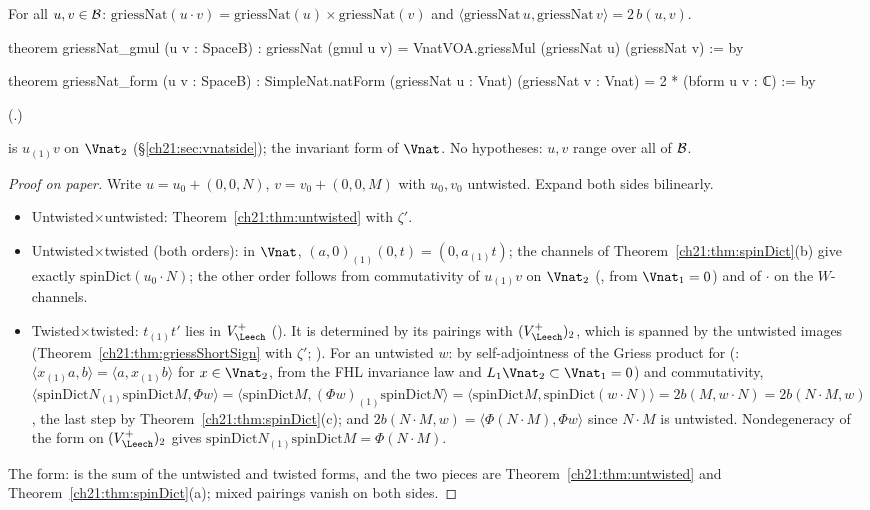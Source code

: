 \begin{theorem}\label{ch21:thm:griessNat}
For all $u,v\in\mathcal{B}$: $\mathrm{griessNat}(u\cdot v)=\mathrm{griessNat}(u)\times\mathrm{griessNat}(v)$
and $\langle\mathrm{griessNat}\,u,\mathrm{griessNat}\,v\rangle=2\,b(u,v)$.
\end{theorem}
\begin{leancode}
theorem griessNat_gmul (u v : SpaceB) :
    griessNat (gmul u v) = VnatVOA.griessMul (griessNat u) (griessNat v) := by
\end{leancode}
\begin{leancode}
theorem griessNat_form (u v : SpaceB) :
    SimpleNat.natForm (griessNat u : Vnat) (griessNat v : Vnat) = 2 * (bform u v : ℂ) := by
\end{leancode}
(.)
\begin{dictionary}
 is $u_{(1)}v$ on $\Vnat_2$ (\S\ref{ch21:sec:vnatside});  the
invariant form of $\Vnat$.  No hypotheses: $u,v$ range over all of $\mathcal{B}$.
\end{dictionary}
\begin{proof}[Proof on paper]
Write $u=u_0+(0,0,N)$, $v=v_0+(0,0,M)$ with $u_0,v_0$ untwisted.  Expand both sides bilinearly.
\begin{itemize}
\item Untwisted$\times$untwisted: Theorem~\ref{ch21:thm:untwisted} with $\zeta'$.
\item Untwisted$\times$twisted (both orders): in $\Vnat$, $(a,0)_{(1)}(0,t)=(0,a_{(1)}t)$; the
  channels of Theorem~\ref{ch21:thm:spinDict}(b) give exactly $\mathrm{spinDict}(u_0\cdot N)$; the other
  order follows from commutativity of $u_{(1)}v$ on $\Vnat_2$ (, from $\Vnat_1=0$)
  and of $\cdot$ on the $W$-channels.
\item Twisted$\times$twisted: $t_{(1)}t'$ lies in $V_\Leech^+$ ().
  It is determined by its pairings with $(V_\Leech^+)_2$, which is spanned by the untwisted images
  (Theorem~\ref{ch21:thm:griessShortSign} with $\zeta'$; ).  For an
  untwisted $w$: by self-adjointness of the Griess product for 
  (: $\langle x_{(1)}a,b\rangle=\langle a,x_{(1)}b\rangle$ for $x\in\Vnat_2$,
  from the FHL invariance law and $L_1\Vnat_2\subset\Vnat_1=0$) and commutativity,
  $\langle\mathrm{spinDict}N_{(1)}\mathrm{spinDict}M,\Phi w\rangle=\langle\mathrm{spinDict}M,(\Phi w)_{(1)}\mathrm{spinDict}N\rangle
  =\langle\mathrm{spinDict}M,\mathrm{spinDict}(w\cdot N)\rangle=2b(M,w\cdot N)=2b(N\cdot M,w)$,
  the last step by Theorem~\ref{ch21:thm:spinDict}(c); and $2b(N\cdot M,w)=\langle\Phi(N\cdot M),\Phi w\rangle$
  since $N\cdot M$ is untwisted.  Nondegeneracy of the form on $(V_\Leech^+)_2$ gives
  $\mathrm{spinDict}N_{(1)}\mathrm{spinDict}M=\Phi(N\cdot M)$.
\end{itemize}
The form:  is the sum of the untwisted and twisted forms, and the two pieces are
Theorem~\ref{ch21:thm:untwisted} and Theorem~\ref{ch21:thm:spinDict}(a); mixed pairings vanish on both
sides.
\end{proof}
